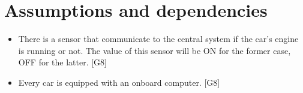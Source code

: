 \section{Assumptions and dependencies}

\begin{itemize}
	\item There is a sensor that communicate to the central system if the car's engine is running or not. The value of this sensor will be ON for the former case, OFF for the latter. [G8]
	\item Every car is equipped with an onboard computer. [G8]
\end{itemize}